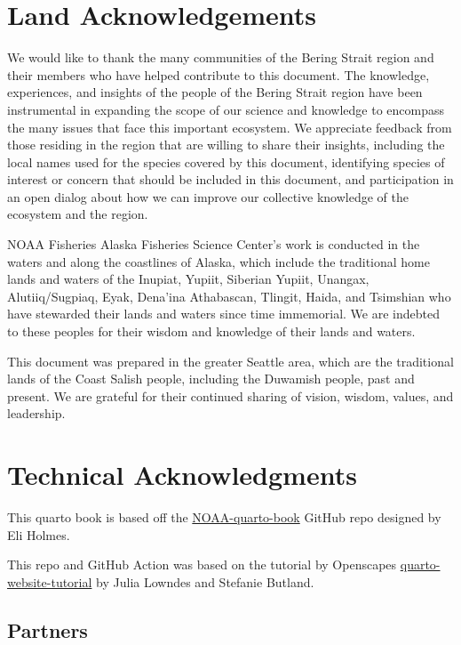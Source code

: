\documentclass[
  letterpaper,
  oneside,
  open=any]{scrbook}
\begin{document}
\chapter{Land Acknowledgements}\label{land-acknowledgements}

We would like to thank the many communities of the Bering Strait region
and their members who have helped contribute to this document. The
knowledge, experiences, and insights of the people of the Bering Strait
region have been instrumental in expanding the scope of our science and
knowledge to encompass the many issues that face this important
ecosystem. We appreciate feedback from those residing in the region that
are willing to share their insights, including the local names used for
the species covered by this document, identifying species of interest or
concern that should be included in this document, and participation in
an open dialog about how we can improve our collective knowledge of the
ecosystem and the region.

NOAA Fisheries Alaska Fisheries Science Center's work is conducted in
the waters and along the coastlines of Alaska, which include the
traditional home lands and waters of the Inupiat, Yupiit, Siberian
Yupiit, Unangax, Alutiiq/Sugpiaq, Eyak, Dena'ina Athabascan, Tlingit,
Haida, and Tsimshian who have stewarded their lands and waters since
time immemorial. We are indebted to these peoples for their wisdom and
knowledge of their lands and waters.

This document was prepared in the greater Seattle area, which are the
traditional lands of the Coast Salish people, including the Duwamish
people, past and present. We are grateful for their continued sharing of
vision, wisdom, values, and leadership.

\chapter{Technical Acknowledgments}\label{technical-acknowledgments}

This quarto book is based off the
\href{https://github.com/nmfs-opensci/NOAA-quarto-book}{NOAA-quarto-book}
GitHub repo designed by Eli Holmes.

This repo and GitHub Action was based on the tutorial by Openscapes
\href{https://github.com/Openscapes/quarto-website-tutorial}{quarto-website-tutorial}
by Julia Lowndes and Stefanie Butland.

\section{Partners}\label{partners}
\end{document}
